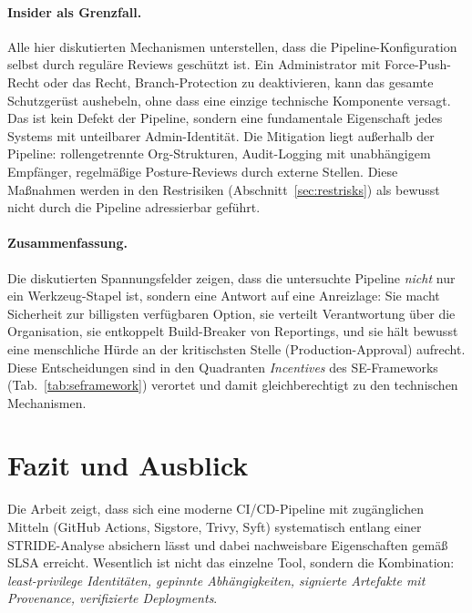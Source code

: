 \documentclass[12pt, a4paper]{scrartcl}
\begin{document}
\paragraph{Insider als Grenzfall.}
Alle hier diskutierten Mechanismen unterstellen, dass die
Pipeline-Konfiguration selbst durch reguläre Reviews geschützt ist.
Ein Administrator mit Force-Push-Recht oder das Recht, Branch-Protection
zu deaktivieren, kann das gesamte Schutzgerüst aushebeln, ohne dass
eine einzige technische Komponente versagt. Das ist kein Defekt der
Pipeline, sondern eine fundamentale Eigenschaft jedes Systems mit
unteilbarer Admin-Identität. Die Mitigation liegt außerhalb der
Pipeline: rollengetrennte Org-Strukturen, Audit-Logging mit
unabhängigem Empfänger, regelmäßige Posture-Reviews durch externe
Stellen. Diese Maßnahmen werden in den Restrisiken
(Abschnitt~\ref{sec:restrisks}) als bewusst nicht durch die Pipeline
adressierbar geführt.

\paragraph{Zusammenfassung.}
Die diskutierten Spannungsfelder zeigen, dass die untersuchte Pipeline
\emph{nicht} nur ein Werkzeug-Stapel ist, sondern eine Antwort auf
eine Anreizlage: Sie macht Sicherheit zur billigsten verfügbaren
Option, sie verteilt Verantwortung über die Organisation, sie
entkoppelt Build-Breaker von Reportings, und sie hält bewusst eine
menschliche Hürde an der kritischsten Stelle (Production-Approval)
aufrecht. Diese Entscheidungen sind in den Quadranten
\emph{Incentives} des SE-Frameworks
(Tab.~\ref{tab:seframework}) verortet und damit gleichberechtigt zu
den technischen Mechanismen.

\section{Fazit und Ausblick}\label{sec:fazit}

Die Arbeit zeigt, dass sich eine moderne CI/CD-Pipeline mit
zugänglichen Mitteln (GitHub Actions, Sigstore, Trivy, Syft) systematisch
entlang einer STRIDE-Analyse absichern lässt und dabei nachweisbare
Eigenschaften gemäß SLSA erreicht. Wesentlich ist nicht das einzelne Tool,
sondern die Kombination: \emph{least-privilege Identitäten, gepinnte
Abhängigkeiten, signierte Artefakte mit Provenance, verifizierte Deployments}.
\end{document}
